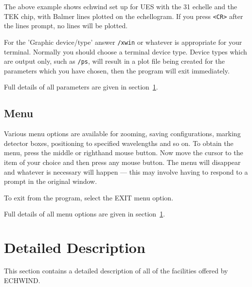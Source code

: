 \documentclass[11pt,nolof,noabs]{starlink}
\begin{document}

The above example shows echwind set up for UES with the 31 echelle and the
TEK chip, with Balmer lines plotted on the echellogram. If you press
\verb+<CR>+ after the lines prompt, no lines will be plotted.

For the 'Graphic device/type' answer \texttt{/xwin} or whatever is appropriate
for your terminal. Normally you should choose a terminal device type. Device
types which are output only, such as \texttt{/ps}, will result in a plot file being
created for the parameters which you have chosen,
then the program will exit immediately.

Full details of all parameters are given in section~\ref{Detailed Description}.

\subsection{Menu}

Various menu options are available for zooming, saving configurations,
marking detector boxes, positioning to specified wavelengths and so on. To
obtain the menu, press the middle or righthand mouse button.
Now move the cursor to the item of your choice and then press
any mouse button. The menu will disappear and whatever is necessary will
happen --- this may involve having to respond to a prompt in the original
window.

To exit from the program, select the EXIT menu option.

Full details of all menu options are given in
section~\ref{Detailed Description}.

\section{Detailed Description}
\label{Detailed Description}

This section contains a detailed description of all of the facilities offered
by ECHWIND.
\end{document}
